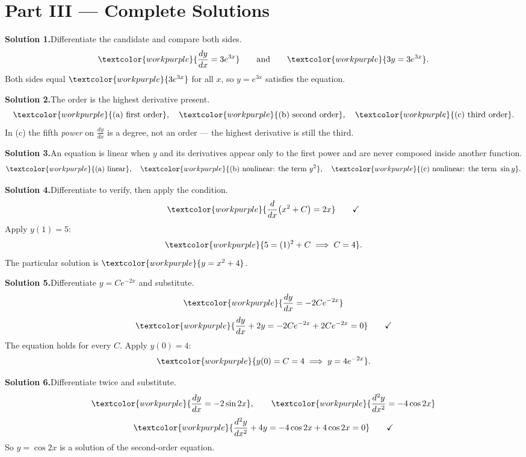 \clearpage
{}
{}
\section*{Part III --- Complete Solutions}

\noindent\textbf{Solution 1.}\quad Differentiate the candidate and compare both
sides.
\[ \textcolor{workpurple}{\frac{dy}{dx} = 3e^{3x}} \qquad\text{and}\qquad
   \textcolor{workpurple}{3y = 3e^{3x}}. \]
Both sides equal $\textcolor{workpurple}{3e^{3x}}$ for all $x$, so $y = e^{3x}$
satisfies the equation.

\medskip
\noindent\textbf{Solution 2.}\quad The order is the highest derivative present.
\[ \textcolor{workpurple}{\text{(a) first order}}, \quad
   \textcolor{workpurple}{\text{(b) second order}}, \quad
   \textcolor{workpurple}{\text{(c) third order}}. \]
In (c) the fifth \emph{power} on $\frac{dy}{dx}$ is a degree, not an order ---
the highest derivative is still the third.

\medskip
\noindent\textbf{Solution 3.}\quad An equation is linear when $y$ and its
derivatives appear only to the first power and are never composed inside another
function.
\[ \textcolor{workpurple}{\text{(a) linear}}, \quad
   \textcolor{workpurple}{\text{(b) nonlinear: the term } y^{2}}, \quad
   \textcolor{workpurple}{\text{(c) nonlinear: the term } \sin y}. \]

\medskip
\noindent\textbf{Solution 4.}\quad Differentiate to verify, then apply the
condition.
\[ \textcolor{workpurple}{\frac{d}{dx}\big(x^{2} + C\big) = 2x} \qquad\checkmark \]
Apply $y(1) = 5$:
\[ \textcolor{workpurple}{5 = (1)^{2} + C \;\Longrightarrow\; C = 4}. \]
The particular solution is $\textcolor{workpurple}{y = x^{2} + 4}$.

\medskip
\noindent\textbf{Solution 5.}\quad Differentiate $y = Ce^{-2x}$ and substitute.
\[ \textcolor{workpurple}{\frac{dy}{dx} = -2Ce^{-2x}} \]
\[ \textcolor{workpurple}{\frac{dy}{dx} + 2y = -2Ce^{-2x} + 2Ce^{-2x} = 0} \qquad\checkmark \]
The equation holds for every $C$. Apply $y(0) = 4$:
\[ \textcolor{workpurple}{y(0) = C = 4 \;\Longrightarrow\; y = 4e^{-2x}}. \]

\medskip
\noindent\textbf{Solution 6.}\quad Differentiate twice and substitute.
\[ \textcolor{workpurple}{\frac{dy}{dx} = -2\sin 2x}, \qquad
   \textcolor{workpurple}{\frac{d^{2}y}{dx^{2}} = -4\cos 2x} \]
\[ \textcolor{workpurple}{\frac{d^{2}y}{dx^{2}} + 4y = -4\cos 2x + 4\cos 2x = 0} \qquad\checkmark \]
So $y = \cos 2x$ is a solution of the second-order equation.

